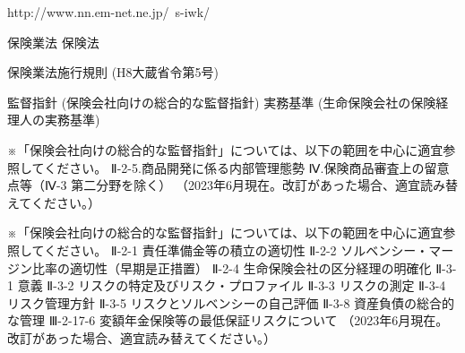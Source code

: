 \documentclass[report,gutter=10mm,fore-edge=10mm,uplatex,dvipdfmx]{jlreq}
\begin{document}
http://www.nn.em-net.ne.jp/~s-iwk/

保険業法
保険法

保険業法施行規則 (H8大蔵省令第5号)

監督指針 (保険会社向けの総合的な監督指針)
実務基準 (生命保険会社の保険経理人の実務基準)


※「保険会社向けの総合的な監督指針」については、以下の範囲を中心に適宜参照してください。
Ⅱ-2-5.商品開発に係る内部管理態勢
Ⅳ.保険商品審査上の留意点等（Ⅳ-3 第二分野を除く）
（2023年6月現在。改訂があった場合、適宜読み替えてください。）

※「保険会社向けの総合的な監督指針」については、以下の範囲を中心に適宜参照してください。
Ⅱ-2-1 責任準備金等の積立の適切性
Ⅱ-2-2 ソルベンシー・マージン比率の適切性（早期是正措置）
Ⅱ-2-4 生命保険会社の区分経理の明確化
Ⅱ-3-1 意義
Ⅱ-3-2 リスクの特定及びリスク・プロファイル
Ⅱ-3-3 リスクの測定
Ⅱ-3-4 リスク管理方針
Ⅱ-3-5 リスクとソルベンシーの自己評価
Ⅱ-3-8 資産負債の総合的な管理
Ⅲ-2-17-6 変額年金保険等の最低保証リスクについて
（2023年6月現在。改訂があった場合、適宜読み替えてください。）
\end{document}
